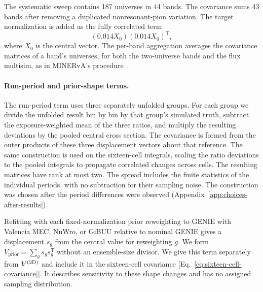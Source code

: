 The systematic sweep contains 187 universes in 44 bands. The covariance sums 43 bands after removing a duplicated nonresonant-pion variation. The target normalization is added as the fully correlated term
\begin{equation}
  (0.014X_0)(0.014X_0)^{\mathsf T},
  \label{eq:normband}
\end{equation}
where $X_0$ is the central vector. The per-band aggregation averages the covariance matrices of a band's universes, for both the two-universe bands and the flux multisim, as in MINERvA's procedure~\cite{MINERvA:2022incl}.

\paragraph{Run-period and prior-shape terms.} The run-period term uses three separately unfolded groups. For each group we divide the unfolded result bin by bin by that group's simulated truth, subtract the exposure-weighted mean of the three ratios, and multiply the resulting deviations by the pooled central cross section. The covariance is formed from the outer products of these three displacement vectors about that reference. The same construction is used on the sixteen-cell integrals, scaling the ratio deviations to the pooled integrals to propagate correlated changes across cells. The resulting matrices have rank at most two. The spread includes the finite statistics of the individual periods, with no subtraction for their sampling noise. The construction was chosen after the period differences were observed (Appendix~\ref{app:choices-after-results}).

Refitting with each fixed-normalization prior reweighting to GENIE with Valencia MEC, NuWro, or GiBUU relative to nominal GENIE gives a displacement $s_g$ from the central value for reweighting $g$. We form $V_{\mathrm{prior}}=\sum_g s_gs_g^{\mathsf T}$ without an ensemble-size divisor. We give this term separately from $V^{(2\mathrm{D})}$ and include it in the sixteen-cell covariance [Eq.~\eqref{eq:sixteen-cell-covariance}]. It describes sensitivity to these shape changes and has no assigned sampling distribution.

